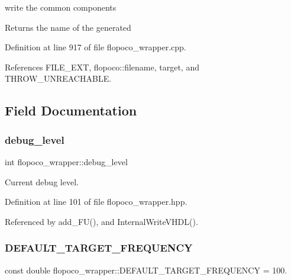 write the common components 

\begin{DoxyReturn}{Returns}
the name of the generated 
\end{DoxyReturn}


Definition at line 917 of file flopoco\+\_\+wrapper.\+cpp.



References F\+I\+L\+E\+\_\+\+E\+XT, flopoco\+::filename, target, and T\+H\+R\+O\+W\+\_\+\+U\+N\+R\+E\+A\+C\+H\+A\+B\+LE.



\subsection{Field Documentation}
\mbox{\label{classflopoco__wrapper_a4adf4414034e81e388ddbdb16e7da779}} 
\subsubsection{\texorpdfstring{debug\+\_\+level}{debug\_level}}
{\footnotesize\ttfamily int flopoco\+\_\+wrapper\+::debug\+\_\+level\hspace{0.3cm}{\ttfamily [private]}}



Current debug level. 



Definition at line 101 of file flopoco\+\_\+wrapper.\+hpp.



Referenced by add\+\_\+\+F\+U(), and Internal\+Write\+V\+H\+D\+L().

\mbox{\label{classflopoco__wrapper_aa0540c8401c605f646a3fca9c5fa93d6}} 
\subsubsection{\texorpdfstring{D\+E\+F\+A\+U\+L\+T\+\_\+\+T\+A\+R\+G\+E\+T\+\_\+\+F\+R\+E\+Q\+U\+E\+N\+CY}{DEFAULT\_TARGET\_FREQUENCY}}
{\footnotesize\ttfamily const double flopoco\+\_\+wrapper\+::\+D\+E\+F\+A\+U\+L\+T\+\_\+\+T\+A\+R\+G\+E\+T\+\_\+\+F\+R\+E\+Q\+U\+E\+N\+CY = 100.\hspace{0.3cm}{\ttfamily [static]}}



